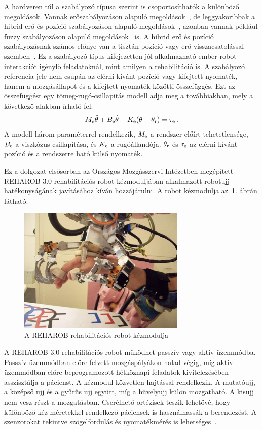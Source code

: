 A hardveren túl a szabályozó típusa szerint is csoportosíthatók a különböző megoldások. Vannak erőszabályozáson 
alapuló megoldások~\cite{kovacs2003dynamics}, de leggyakoribbak a hibrid erő és 
pozíció szabályozáson alapuló megoldások~\cite{Hua2019,Xie2021}, azonban vannak például fuzzy szabályozáson alapuló megoldások~\cite{Hu2023} is.
A hibrid erő és pozíció szabályozásnak számos előnye van a tisztán pozíció vagy erő visszacsatolással 
szemben~\cite{hogan1984Impedance,hogan1985ImpedancePART1,hogan1985ImpedancePART2,hogan1985ImpedancePART3,kovacs2003dynamics,stepan2001vibrations}.
Ez a szabályozó típus kifejezetten jól alkalmazható ember-robot interakciót igénylő feladatoknál, mint amilyen 
a rehabilitáció is. A szabályozó referencia jele nem csupán 
az elérni kívánt pozíció vagy kifejtett nyomaték, hanem a mozgásállapot és a kifejtett
nyomaték közötti összefüggés. Ezt az összefüggést egy 
tömeg-rugó-csillapitás modell adja meg a továbbiakban, mely a következő alakban
írható fel: 
\begin{align}
    M_{\mathrm{e}} \ddot \theta + B_{\mathrm{e}} \dot \theta + K_{\mathrm{e}} (\theta - \theta_{\mathrm{r}}) = \tau_{\mathrm{e}}\,.
\end{align}
A modell három paraméterrel rendelkezik, $M_{\mathrm{e}}$ a rendszer előírt tehetetlensége, 
$B_{\mathrm{e}}$ a viszkózus csillapítása, és $K_{\mathrm{e}}$ a rugóállandója. 
$\theta_{\mathrm{r}}$ és $\tau_{\mathrm{e}}$ az elérni kívánt pozíció és a rendszerre ható külső nyomaték. 

Ez a dolgozat elsősorban az Országos Mozgásszervi Intézetben megépített REHAROB 3.0 
rehabilitációs robot kézmoduljában alkalmazott robotujj hatékonyságának javításához kíván hozzájárulni.
A robot kézmodulja az~\ref{fig:reharob_hand_module}. ábrán látható.
\begin{figure}[H]
    \begin{center}
    \includegraphics[width=8cm]{images/reharob_hand_module.png}
    \caption{A REHAROB rehabilitációs robot kézmodulja}\label{fig:reharob_hand_module}
    \end{center}
\end{figure}
A REHAROB 3.0 rehabilitációs robot működhet passzív vagy aktív üzemmódba. Passzív üzemmódban előre felvett 
mozgáspályákon halad végig, míg aktív üzemmódban előre beprogramozott hétköznapi feladatok 
kivitelezésében asszisztálja a pácienst. A kézmodul közvetlen hajtással rendelkezik. A mutatóujj, a középső ujj és a
gyűrűs ujj együtt, míg a hüvelyujj külön mozgatható. A kisujj nem vesz részt a mozgatásban. Cserélhető ortézisek 
teszik lehetővé, hogy különböző kéz méretekkel rendelkező páciensek is használhassák a berendezést. A szenzorokat 
tekintve szögelfordulás és nyomatékmérés is lehetséges~\cite{Bauer2021}.

